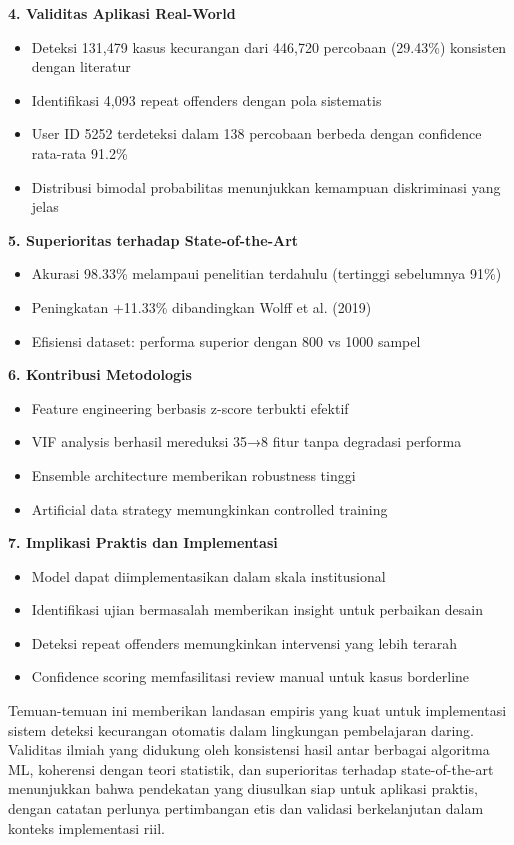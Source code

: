 \textbf{4. Validitas Aplikasi Real-World}
\begin{itemize}
    \item Deteksi 131,479 kasus kecurangan dari 446,720 percobaan (29.43\%) konsisten dengan literatur
    \item Identifikasi 4,093 repeat offenders dengan pola sistematis
    \item User ID 5252 terdeteksi dalam 138 percobaan berbeda dengan confidence rata-rata 91.2\%
    \item Distribusi bimodal probabilitas menunjukkan kemampuan diskriminasi yang jelas
\end{itemize}

\textbf{5. Superioritas terhadap State-of-the-Art}
\begin{itemize}
    \item Akurasi 98.33\% melampaui penelitian terdahulu (tertinggi sebelumnya 91\%)
    \item Peningkatan +11.33\% dibandingkan Wolff et al. (2019)
    \item Efisiensi dataset: performa superior dengan 800 vs 1000 sampel
\end{itemize}

\textbf{6. Kontribusi Metodologis}
\begin{itemize}
    \item Feature engineering berbasis z-score terbukti efektif
    \item VIF analysis berhasil mereduksi 35→8 fitur tanpa degradasi performa
    \item Ensemble architecture memberikan robustness tinggi
    \item Artificial data strategy memungkinkan controlled training
\end{itemize}

\textbf{7. Implikasi Praktis dan Implementasi}
\begin{itemize}
    \item Model dapat diimplementasikan dalam skala institusional
    \item Identifikasi ujian bermasalah memberikan insight untuk perbaikan desain
    \item Deteksi repeat offenders memungkinkan intervensi yang lebih terarah
    \item Confidence scoring memfasilitasi review manual untuk kasus borderline
\end{itemize}

Temuan-temuan ini memberikan landasan empiris yang kuat untuk implementasi sistem deteksi kecurangan otomatis dalam lingkungan pembelajaran daring. Validitas ilmiah yang didukung oleh konsistensi hasil antar berbagai algoritma ML, koherensi dengan teori statistik, dan superioritas terhadap state-of-the-art menunjukkan bahwa pendekatan yang diusulkan siap untuk aplikasi praktis, dengan catatan perlunya pertimbangan etis dan validasi berkelanjutan dalam konteks implementasi riil. 